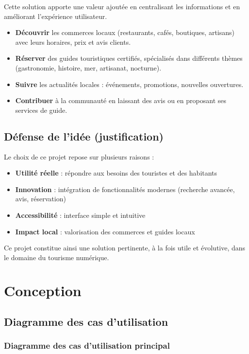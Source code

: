 \documentclass[12pt,a4paper]{report}
\begin{document}
Cette solution apporte une valeur ajoutée en centralisant les informations et en améliorant l’expérience utilisateur.

\begin{itemize}
  \item \textbf{Découvrir} les commerces locaux (restaurants, cafés, boutiques, artisans)
        avec leurs horaires, prix et avis clients.
  \item \textbf{Réserver} des guides touristiques certifiés, spécialisés dans différents
        thèmes (gastronomie, histoire, mer, artisanat, nocturne).
  \item \textbf{Suivre} les actualités locales : événements, promotions, nouvelles ouvertures.
  \item \textbf{Contribuer} à la communauté en laissant des avis ou en proposant ses
        services de guide.
\end{itemize}

\section{Défense de l’idée (justification)}

Le choix de ce projet repose sur plusieurs raisons :

\begin{itemize}
    \item \textbf{Utilité réelle} : répondre aux besoins des touristes et des habitants
    \item \textbf{Innovation} : intégration de fonctionnalités modernes (recherche avancée, avis, réservation)
    \item \textbf{Accessibilité} : interface simple et intuitive
    \item \textbf{Impact local} : valorisation des commerces et guides locaux
\end{itemize}

Ce projet constitue ainsi une solution pertinente, à la fois utile et évolutive, dans le domaine du tourisme numérique.

\chapter{Conception}
\section{Diagramme des cas d'utilisation}
\subsection*{ Diagramme des cas d'utilisation principal}
\end{document}
